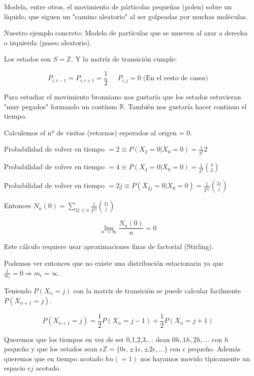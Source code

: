\begin{center}
\end{center}

Modela, entre otros, el movimiento de párticolas pequeñas (polen) sobre un líquido, que siguen un "camino aleatorio" al ser golpeadas por muchas moléculas.

Nuestro ejemplo concreto: Modelo de partículas que se mueven al azar a derecha o izquierda (paseo aleatorio).

Los estados son $S = \mathbb{Z}$. Y la matríz de transición cumple:


$$ P_{i,i-1} = P_{i, i+1} = \frac{1}{2} \;\;\;\;\; P_{i,j} = 0  \text{  (En el resto de casos)} $$


Para estudiar el movimiento bronniano nos gustaría que los estados estuvieran "muy pegados" formando un contínuo $\mathbb{R}$. También nos gustaría hacer continuo el tiempo.


Calculemos el nº de visitas (retornos) esperados al origen = 0.

Probabilidad de volver en tiempo $ = 2 \equiv P(X_{2} = 0 | X_{0} = 0) = \frac{1}{2^2} 2 $

Probabilidad de volver en tiempo $ = 4 \equiv P(X_{4} = 0 | X_{0} = 0) = \frac{1}{2^4} \binom{4}{2} $

Probabilidad de volver en tiempo $ = 2j \equiv P(X_{2j} = 0 | X_{0} = 0) = \frac{1}{2^{2j}} \binom{2j}{j} $


Entonces $ N_{n} (0) = \sum\limits_{2j \leq n} \frac{1}{2^{2j}} \binom{2j}{j} $

$$ \lim_{n \rightarrow \infty} \frac{N_{n}(0)}{n} = 0 $$

Este cálculo requiere usar aproximaciones finas de factorial (Stirling).

Podemos ver entonces que no existe una distribución estacionaria ya que $\frac{1}{m_i} = 0 \Rightarrow m_i = \infty$.



Teniendo $P(X_{n} = j)$ con la matriz de transición se puede calcular facilmente $P(X_{n+1} = j)$.

$$ P(X_{n+1} = j) = \frac{1}{2} P(X_{n} = j-1) + \frac{1}{2} P(X_{n} = j+1) $$


Queremos que los tiempos en vez de ser 0,1,2,3,... dean $0h, 1h, 2h, ...$ con $h$ pequeño y que los estados sean $\epsilon \mathbb{Z} = \{ 0\epsilon, \pm 1\epsilon, \pm 2\epsilon, ... \}$ con $\epsilon$ pequeño. Además queremos que en tiempo acotado $hn (=1)$ nos hayamos movido típicamente un espacio $\epsilon j$ acotado.

